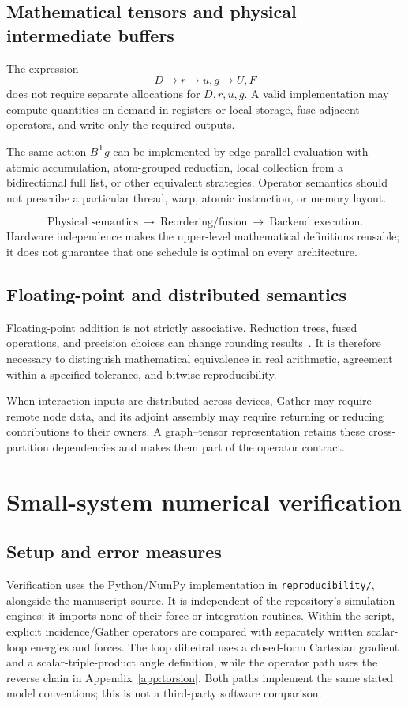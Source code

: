 \documentclass[11pt,a4paper]{article}
\theoremstyle{definition}
\begin{document}
\subsection{Mathematical tensors and physical intermediate buffers}
The expression
\begin{equation}
D\to r\to u,g\to U,F
\end{equation}
does not require separate allocations for $D,r,u,g$. A valid implementation may compute
quantities on demand in registers or local storage, fuse adjacent operators, and write only the
required outputs.

The same action $B^{\mathsf T}g$ can be implemented by edge-parallel evaluation with atomic
accumulation, atom-grouped reduction, local collection from a bidirectional full list, or other
equivalent strategies. Operator semantics should not prescribe a particular thread, warp, atomic
instruction, or memory layout.

\begin{equation}
\text{Physical semantics}\ \longrightarrow\
\text{Reordering/fusion}\ \longrightarrow\
\text{Backend execution}.
\end{equation}
Hardware independence makes the upper-level mathematical definitions reusable; it does not
guarantee that one schedule is optimal on every architecture.

\subsection{Floating-point and distributed semantics}
Floating-point addition is not strictly associative. Reduction trees, fused operations, and
precision choices can change rounding results~\cite{nvidia-fp}. It is therefore necessary to
distinguish mathematical equivalence in real arithmetic, agreement within a specified tolerance,
and bitwise reproducibility.

When interaction inputs are distributed across devices, Gather may require remote node data, and
its adjoint assembly may require returning or reducing contributions to their owners. A
graph--tensor representation retains these cross-partition dependencies and makes them part of
the operator contract.
\section{Small-system numerical verification}
\label{sec:experiments}
\subsection{Setup and error measures}
Verification uses the Python/NumPy implementation in \texttt{reproducibility/}, alongside
the manuscript source. It is independent of the repository's simulation engines: it imports
none of their force or integration routines. Within the script, explicit incidence/Gather
operators are compared with separately written scalar-loop energies and forces. The loop
dihedral uses a closed-form Cartesian gradient and a scalar-triple-product angle definition,
while the operator path uses the reverse chain in Appendix~\ref{app:torsion}. Both paths
implement the same stated model conventions; this is not a third-party software comparison.
\end{document}

